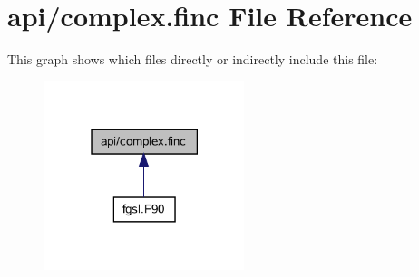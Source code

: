 \hypertarget{complex_8finc}{}\section{api/complex.finc File Reference}
\label{complex_8finc}
This graph shows which files directly or indirectly include this file\+:\nopagebreak
\begin{figure}[H]
\begin{center}
\leavevmode
\includegraphics[width=166pt]{complex_8finc__dep__incl}
\end{center}
\end{figure}
